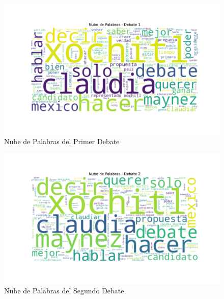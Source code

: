 \documentclass[10pt, a4paper]{article}
\begin{document}
	
	\newpage
	\vspace{-7mm}
	\begin{figure}[h!]
		\centering
		\includegraphics[width=1\textwidth]{nube_palabras_debate_1.pdf} %
		\vspace{-22mm}
		\caption{Nube de Palabras del Primer Debate}
		\label{fig:nubeDebate1} %
	\end{figure}

	
	\vspace{-4mm}
	\begin{figure}[h!]
		\centering
		\includegraphics[width=1\textwidth]{nube_palabras_debate_2.pdf} %
		\vspace{-22mm}
		\caption{Nube de Palabras del Segundo Debate}
		\label{fig:nubeDebate2} %
	\end{figure}
	
\end{document}
